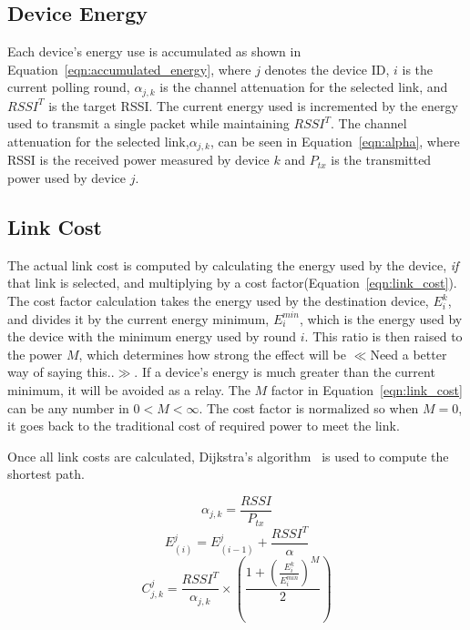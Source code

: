 \documentclass{article}
\begin{document}
\subsection{Device Energy}
Each device's energy use is accumulated as shown in Equation~\ref{eqn:accumulated_energy}, where $j$ denotes the device ID, $i$ is the current polling round, $\alpha_{j,k}$ is the channel attenuation for the selected link, and $RSSI^T$ is the target RSSI. The current energy used is incremented by the energy used to transmit a single packet while maintaining $RSSI^T$. The channel attenuation for the selected link,$\alpha_{j,k}$, can be seen in Equation~\ref{eqn:alpha}, where RSSI is the received power measured by device $k$ and $P_{tx}$ is the transmitted power used by device $j$. 

\subsection{Link Cost}
The actual link cost is computed by calculating the energy used by the device, \emph{if} that link is selected, and multiplying by a cost factor(Equation~\ref{eqn:link_cost}). The cost factor calculation takes the energy used by the destination device, $E^k_i$, and divides it by the current energy minimum, $E^{min}_{i}$, which is the energy used by the device with the minimum energy used by round $i$. This ratio is then raised to the power $M$, which determines how strong the effect will be $\ll$Need a better way of saying this..$\gg$. If a device's energy is much greater than the current minimum, it will be avoided as a relay.
The $M$ factor in Equation~\ref{eqn:link_cost} can be any number in $0 < M < \infty$. The cost factor is normalized so when $M=0$, it goes back to the traditional cost of required power to meet the link.

Once all link costs are calculated, Dijkstra's algorithm~\cite{dijkstra:algorithm} is used to compute the shortest path.

\begin{equation}
\label{eqn:alpha}
\alpha_{j,k} = \frac{RSSI}{P_{tx}}
\end{equation}
\begin{equation}
\label{eqn:accumulated_energy}
E^j_{(i)} = E^j_{(i-1)} + \frac{RSSI^T}{\alpha}
\end{equation}
\begin{equation}
\label{eqn:link_cost}
C^j_{j,k} = \frac{RSSI^T}{\alpha_{j,k}} \times \left( \frac{1+\left(\frac{E^k_i}{E^{min}_{i}} \right)^M}{2} \right)
\end{equation}
\end{document}
